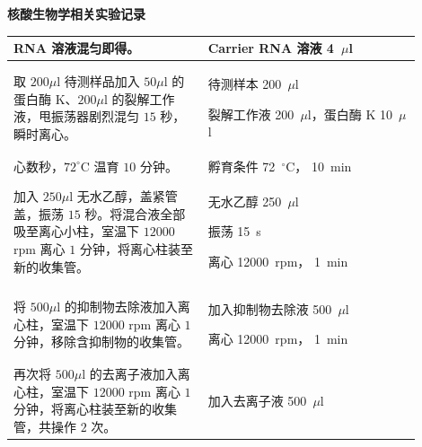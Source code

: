 \documentclass[UTF8,10pt,a4paper,fontset=fandol]{ctexart}
\newcommand{\fieldvalue}[1]{#1}
\newcommand{\handwritten}[1]{#1}
\begin{document}
\newpage

\begin{center}
\textbf{核酸生物学相关实验记录}
\end{center}

\begin{tabular}{|p{0.43\linewidth}|p{0.47\linewidth}|}
\hline
RNA 溶液混匀即得。 &
Carrier RNA 溶液
\fieldvalue{\handwritten{4}}~$\mu$l
\\ \hline
取 $200\mu$l 待测样品加入 $50\mu$l 的蛋白酶 K、$200\mu$l 的裂解工作液，甩振荡器剧烈混匀 $15$ 秒，瞬时离心。 &
待测样本
\fieldvalue{\handwritten{200}}~$\mu$l

裂解工作液
\fieldvalue{\handwritten{200}}~$\mu$l，蛋白酶 K
\fieldvalue{\handwritten{10}}~$\mu$l
\\ \hline
心数秒，$72^\circ$C 温育 $10$ 分钟。 &
孵育条件
\fieldvalue{\handwritten{72}}~$^\circ$C，
\fieldvalue{\handwritten{10}}~min
\\ \hline
加入 $250\mu$l 无水乙醇，盖紧管盖，振荡 $15$ 秒。将混合液全部吸至离心小柱，室温下 $12000$ rpm 离心 $1$ 分钟，将离心柱装至新的收集管。 &
无水乙醇
\fieldvalue{\handwritten{250}}~$\mu$l

振荡
\fieldvalue{\handwritten{15}}~s

离心
\fieldvalue{\handwritten{12000}}~rpm，
\fieldvalue{\handwritten{1}}~min
\\ \hline
将 $500\mu$l 的抑制物去除液加入离心柱，室温下 $12000$ rpm 离心 $1$ 分钟，移除含抑制物的收集管。 &
加入抑制物去除液
\fieldvalue{\handwritten{500}}~$\mu$l

离心
\fieldvalue{\handwritten{12000}}~rpm，
\fieldvalue{\handwritten{1}}~min
\\ \hline
再次将 $500\mu$l 的去离子液加入离心柱，室温下 $12000$ rpm 离心 $1$ 分钟，将离心柱装至新的收集管，共操作 $2$ 次。 &
加入去离子液
\fieldvalue{\handwritten{500}}~$\mu$l


\end{tabular}
\end{document}
